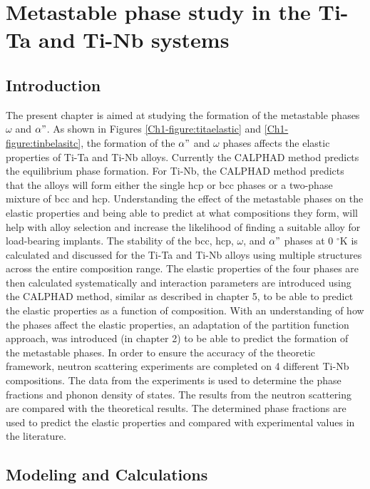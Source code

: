 \chapter{Metastable phase study in the Ti-Ta and Ti-Nb systems}

\section{Introduction}

The present chapter is aimed at studying the formation of the metastable phases $\omega$ and $\alpha"$. As shown in Figures \ref{Ch1-figure:titaelastic} and \ref{Ch1-figure:tinbelasitc}, the formation of the $\alpha"$ and $\omega$ phases affects the elastic properties of Ti-Ta and Ti-Nb alloys. Currently the CALPHAD method predicts the equilibrium phase formation. For Ti-Nb, the CALPHAD method predicts that the alloys will form either the single hcp or bcc phases or a two-phase mixture of bcc and hcp. Understanding the effect of the metastable phases on the elastic properties and being able to predict at what compositions they form, will help with alloy selection and increase the likelihood of finding a suitable alloy for load-bearing implants. The stability of the bcc, hcp, $\omega$, and $\alpha"$ phases at 0 $^\circ$K is calculated and discussed for the Ti-Ta and Ti-Nb alloys using multiple structures across the entire composition range. The elastic properties of the four phases are then calculated systematically and interaction parameters are introduced using the CALPHAD method, similar as described in chapter 5, to be able to predict the elastic properties as a function of composition. With an understanding of how the phases affect the elastic properties, an adaptation of the partition function approach, was introduced (in chapter 2) to be able to predict the formation of the metastable phases. In order to ensure the accuracy of the theoretic framework, neutron scattering experiments are completed on 4 different Ti-Nb compositions. The data from the experiments is used to determine the phase fractions and phonon density of states. The results from the neutron scattering are compared with the theoretical results. The determined phase fractions are used to predict the elastic properties and compared with experimental values in the literature.

\section{Modeling and Calculations}

